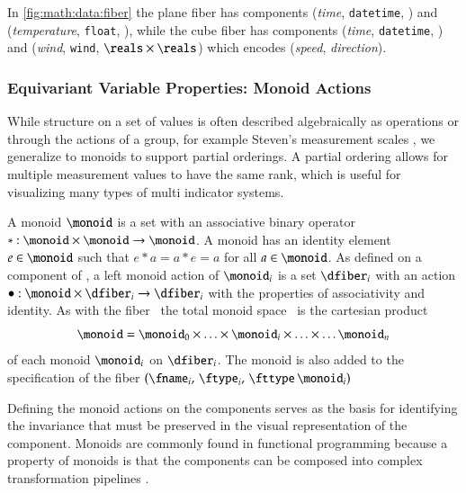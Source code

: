\documentclass[journal]{vgtc}                %
\begin{document}
In \autoref{fig:math:data:fiber} the plane fiber has components (\emph{time}, \texttt{datetime}, \reals) and (\emph{temperature}, \texttt{float}, \reals), while the cube fiber has components (\emph{time}, \texttt{datetime}, \reals) and (\emph{wind}, \texttt{wind}, \(\reals\times\reals\)) which encodes (\emph{speed}, \emph{direction}). 


\subsubsection{Equivariant Variable Properties: Monoid Actions}
\label{sec:math:data:monoid}
While structure on a set of values is often described algebraically as operations or through the actions of a group, for example Steven's measurement scales \cite{stevensTheoryScalesMeasurement1946, leaFormalizationMeasurementScale}, we generalize to monoids to support partial orderings. A partial ordering allows for multiple measurement values to have the same rank\cite{fongInvitationAppliedCategory2019}, which is useful for visualizing many types of multi indicator systems\cite{bruggemannRankingPrioritizationMultiindicator2011}. 

A monoid \cite{Monoid2021} $\monoid$ is a set with an associative binary operator $\ast:\monoid \times \monoid\rightarrow \monoid$. A monoid has an identity element $e\in \monoid$ such that $e\ast a= a \ast e = a$ for all $a \in \monoid$. As defined on a component of \dfiber, a left monoid action \cite{SemigroupAction2021,nlab:action} of $\monoid_i$ is a set $\dfiber_i$ with an action $\bullet: \monoid\times \dfiber_i \rightarrow \dfiber_i$ with the properties of associativity and identity. As with the fiber \dfiber\, the total monoid space \monoid\ is the cartesian product
\begin{equation}\label{eq:math:data:monoid:decompose}
\monoid= \monoid_{0} \times \ldots \times \monoid_{i}\times \ldots \times\ldots \monoid_{n}
\end{equation}
of each monoid $\monoid_{i}$ on $\dfiber_{i}$.  The monoid is also added to the specification of the fiber \((\fname_i,\, \ftype_i,\, \fttype\, \monoid_i)\)

Defining the monoid actions on the components serves as the basis for identifying the invariance\cite{kindlmannAlgebraicProcessVisualization2014} that must be preserved in the visual representation of the component. Monoids are commonly found in functional programming because a property of monoids is that the components can be composed into complex transformation pipelines \cite{yorgeyMonoidsThemeVariations}. 
\end{document}
